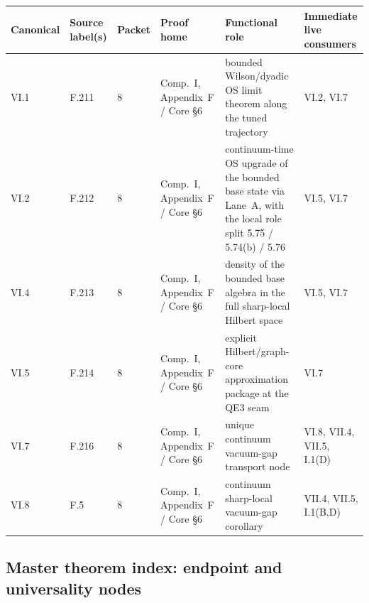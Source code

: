 \begingroup
\scriptsize
\setlength{\tabcolsep}{3pt}
\noindent\begin{tabular}{@{}p{}p{}p{}p{}p{}p{}@{}}
\toprule
\textbf{Canonical} & \textbf{Source label(s)} & \textbf{Packet} & \textbf{Proof home} & \textbf{Functional role} & \textbf{Immediate live consumers}\\
\midrule
VI.1 & F.211 & 8 & Comp.~I, Appendix~F / Core \S6 & bounded Wilson/dyadic OS limit theorem along the tuned trajectory & VI.2, VI.7\\[0.3em]
VI.2 & F.212 & 8 & Comp.~I, Appendix~F / Core \S6 & continuum-time OS upgrade of the bounded base state via Lane~A, with the local role split 5.75 / 5.74(b) / 5.76 & VI.5, VI.7\\[0.3em]
VI.4 & F.213 & 8 & Comp.~I, Appendix~F / Core \S6 & density of the bounded base algebra in the full sharp-local Hilbert space & VI.5, VI.7\\[0.3em]
VI.5 & F.214 & 8 & Comp.~I, Appendix~F / Core \S6 & explicit Hilbert/graph-core approximation package at the QE3 seam & VI.7\\[0.3em]
VI.7 & F.216 & 8 & Comp.~I, Appendix~F / Core \S6 & unique continuum vacuum-gap transport node & VI.8, VII.4, VII.5, I.1(D)\\[0.3em]
VI.8 & F.5 & 8 & Comp.~I, Appendix~F / Core \S6 & continuum sharp-local vacuum-gap corollary & VII.4, VII.5, I.1(B,D)\\
\bottomrule
\end{tabular}
\endgroup

\subsection*{Master theorem index: endpoint and universality nodes}

